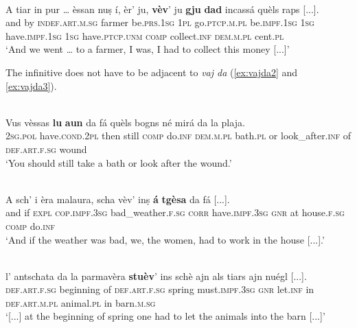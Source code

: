 \ea\label{ex:vajda1}
\\
\gll    A tiar in pur … èssan nuṣ í, èr’ ju, \textbf{vèv}’ ju \textbf{gju} \textbf{dad} incassá quèls raps [...].\\ 
and by \textsc{indef.art.m.sg} farmer {} be.\textsc{prs.1sg} \textsc{1pl} go.\textsc{ptcp.m.pl}  be.\textsc{impf.1sg} \textsc{1sg}  have.\textsc{impf.1sg} \textsc{1sg} have.\textsc{ptcp.unm} \textsc{comp} collect.\textsc{inf}  \textsc{dem.m.pl} cent.\textsc{pl}\\
\glt `And we went … to a farmer, I was, I had to collect this money [...]'
\z


The infinitive does not have to be adjacent to \textit{vaj da} (\ref{ex:vajda2} and \ref{ex:vajda3}). 

\ea
\label{ex:vajda2}
\\
\gll  Vus vèssas \textbf{lu} \textbf{aun} da fá quèls bogns né mirá da la plaja.\\
\textsc{2sg.pol}  have.\textsc{cond.2pl} then still \textsc{comp} do.\textsc{inf} \textsc{dem.m.pl} bath.\textsc{pl} or look\_after.\textsc{inf} of \textsc{def.art.f.sg} wound\\
\glt `You should still take a bath or look after the wound.'
\z

\ea
\label{ex:vajda3}
\\
\gll A sch’ i èra malaura, scha vèv’ inṣ \textbf{á} \textbf{tgèsa} da fá [...].\\
and if \textsc{expl} \textsc{cop.impf.3sg} bad\_weather.\textsc{f.sg} \textsc{corr} have.\textsc{impf.3sg} \textsc{gnr} at house.\textsc{f.sg} \textsc{comp} do.\textsc{inf} \\
\glt `And if the weather was bad, we, the women, had to work in the house [...].'
\z

\ea
\label{ex:stuaj1}
\\
\gll  [...] l’ antschata da la parmavèra \textbf{stuèv}’ ins schè ajn als tiars ajn nuégl [...]. \\
{} \textsc{def.art.f.sg} beginning of \textsc{def.art.f.sg} spring must.\textsc{impf.3sg} \textsc{gnr} let.\textsc{inf} in \textsc{def.art.m.pl} animal.\textsc{pl} in barn.\textsc{m.sg}\\
\glt `[...] at the beginning of spring one had to let the animals into the barn [...]'
\z

